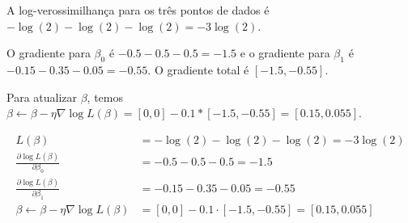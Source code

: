 \documentclass[12pt,a4paper, brazil]{article}
\begin{document}
\begin{enumerate}
A log-verossimilhança para os três pontos de dados é $-\log(2) - \log(2) - \log(2) = -3\log(2)$.

O gradiente para $\beta_0$ é $-0.5 - 0.5 - 0.5 = -1.5$ e o gradiente para $\beta_1$ é $-0.15 - 0.35 - 0.05 = -0.55$. O gradiente total é $[-1.5, -0.55]$.

Para atualizar $\beta$, temos $\beta \leftarrow \beta - \eta \nabla \log L(\beta) = [0, 0] - 0.1 * [-1.5, -0.55] = [0.15, 0.055]$.

\begin{equation*}
\begin{split}
L(\beta) &= -\log(2) - \log(2) - \log(2) = -3\log(2) \\
\frac{\partial \log L(\beta)}{\partial \beta_0} &= -0.5 - 0.5 - 0.5 = -1.5 \\
\frac{\partial \log L(\beta)}{\partial \beta_1} &= -0.15 - 0.35 - 0.05 = -0.55 \\
\beta \leftarrow \beta - \eta \nabla \log L(\beta) &= [0, 0] - 0.1 \cdot [-1.5, -0.55] = [0.15, 0.055]
\end{split}
\end{equation*}

\end{enumerate}




\printbibliography
\end{document}
